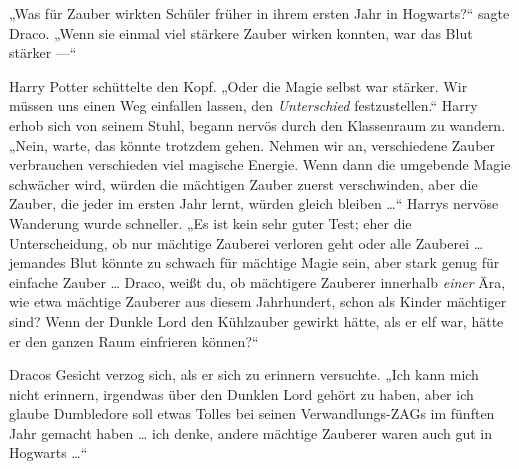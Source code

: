 „Was für Zauber wirkten Schüler früher in ihrem ersten Jahr in Hogwarts?“ sagte Draco.
„Wenn sie einmal viel stärkere Zauber wirken konnten, war das Blut stärker —“

Harry Potter schüttelte den Kopf.
„Oder die Magie selbst war stärker. Wir müssen uns einen Weg einfallen lassen, den \emph{Unterschied} festzustellen.“ Harry erhob sich von seinem Stuhl, begann nervös durch den Klassenraum zu wandern.
„Nein, warte, das könnte trotzdem gehen. Nehmen wir an, verschiedene Zauber verbrauchen verschieden viel magische Energie. Wenn dann die umgebende Magie schwächer wird, würden die mächtigen Zauber zuerst verschwinden, aber die Zauber, die jeder im ersten Jahr lernt, würden gleich bleiben …“ Harrys nervöse Wanderung wurde schneller.
„Es ist kein sehr guter Test; eher die Unterscheidung, ob nur mächtige Zauberei verloren geht oder alle Zauberei … jemandes Blut könnte zu schwach für mächtige Magie sein, aber stark genug für einfache Zauber … Draco, weißt du, ob mächtigere Zauberer innerhalb \emph{einer} Ära, wie etwa mächtige Zauberer aus diesem Jahrhundert, schon als Kinder mächtiger sind? Wenn der Dunkle Lord den Kühlzauber gewirkt hätte, als er elf war, hätte er den ganzen Raum einfrieren können?“

Dracos Gesicht verzog sich, als er sich zu erinnern versuchte.
„Ich kann mich nicht erinnern, irgendwas über den Dunklen Lord gehört zu haben, aber ich glaube Dumbledore soll etwas Tolles bei seinen Verwandlungs-ZAGs im fünften Jahr gemacht haben … ich denke, andere mächtige Zauberer waren auch gut in Hogwarts …“

